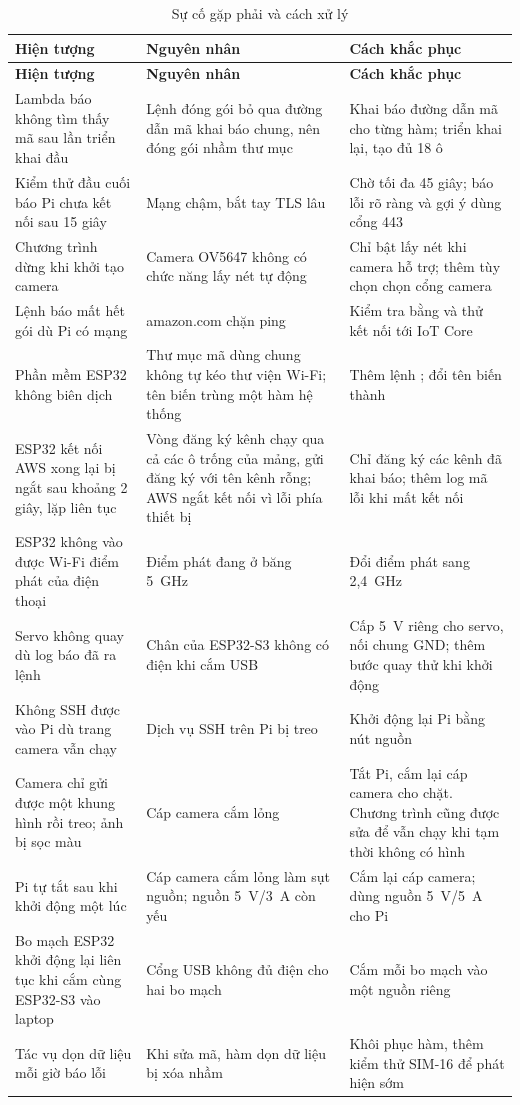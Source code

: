 \begin{longtable}{@{}P{4.3cm}P{4.6cm}P{5.2cm}@{}}
\caption{Sự cố gặp phải và cách xử lý}\label{tab:suco}\\
\toprule
\textbf{Hiện tượng} & \textbf{Nguyên nhân} & \textbf{Cách khắc phục} \\ \midrule
\endfirsthead
\toprule
\textbf{Hiện tượng} & \textbf{Nguyên nhân} & \textbf{Cách khắc phục} \\ \midrule
\endhead
Lambda báo không tìm thấy mã sau lần triển khai đầu & Lệnh đóng gói bỏ qua đường dẫn mã khai báo chung, nên đóng gói nhầm thư mục & Khai báo đường dẫn mã cho từng hàm; triển khai lại, tạo đủ 18 ô \\
Kiểm thử đầu cuối báo Pi chưa kết nối sau 15 giây & Mạng chậm, bắt tay TLS lâu & Chờ tối đa 45 giây; báo lỗi rõ ràng và gợi ý dùng cổng 443 \\
Chương trình dừng khi khởi tạo camera & Camera OV5647 không có chức năng lấy nét tự động & Chỉ bật lấy nét khi camera hỗ trợ; thêm tùy chọn chọn cổng camera \\
Lệnh  báo mất hết gói dù Pi có mạng & amazon.com chặn ping & Kiểm tra bằng  và thử kết nối tới IoT Core \\
Phần mềm ESP32 không biên dịch & Thư mục mã dùng chung không tự kéo thư viện Wi-Fi; tên biến  trùng một hàm hệ thống & Thêm lệnh ; đổi tên biến thành  \\
ESP32 kết nối AWS xong lại bị ngắt sau khoảng 2 giây, lặp liên tục & Vòng đăng ký kênh chạy qua cả các ô trống của mảng, gửi đăng ký với tên kênh rỗng; AWS ngắt kết nối vì lỗi phía thiết bị & Chỉ đăng ký các kênh đã khai báo; thêm log mã lỗi khi mất kết nối \\
ESP32 không vào được Wi-Fi điểm phát của điện thoại & Điểm phát đang ở băng 5~GHz & Đổi điểm phát sang 2,4~GHz \\
Servo không quay dù log báo đã ra lệnh & Chân  của ESP32-S3 không có điện khi cắm USB & Cấp 5~V riêng cho servo, nối chung GND; thêm bước quay thử khi khởi động \\
Không SSH được vào Pi dù trang camera vẫn chạy & Dịch vụ SSH trên Pi bị treo & Khởi động lại Pi bằng nút nguồn \\
Camera chỉ gửi được một khung hình rồi treo; ảnh bị sọc màu & Cáp camera cắm lỏng & Tắt Pi, cắm lại cáp camera cho chặt. Chương trình cũng được sửa để vẫn chạy khi tạm thời không có hình \\
Pi tự tắt sau khi khởi động một lúc & Cáp camera cắm lỏng làm sụt nguồn; nguồn 5~V/3~A còn yếu & Cắm lại cáp camera; dùng nguồn 5~V/5~A cho Pi \\
Bo mạch ESP32 khởi động lại liên tục khi cắm cùng ESP32-S3 vào laptop & Cổng USB không đủ điện cho hai bo mạch & Cắm mỗi bo mạch vào một nguồn riêng \\
Tác vụ dọn dữ liệu mỗi giờ báo lỗi & Khi sửa mã, hàm dọn dữ liệu bị xóa nhầm & Khôi phục hàm, thêm kiểm thử SIM-16 để phát hiện sớm \\
\bottomrule
\end{longtable}
